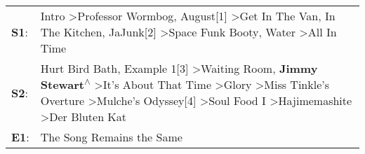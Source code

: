 \begin{supertabular}{p{0.03\textwidth}p{0.92\textwidth}}
 \textbf{S1}:  &                                                                                                                                                                                    Intro\textsuperscript{} \textgreater \enspace Professor Wormbog\textsuperscript{}, \enspace August[1]\textsuperscript{} \textgreater \enspace Get In The Van\textsuperscript{}, \enspace In The Kitchen\textsuperscript{}, \enspace JaJunk[2]\textsuperscript{} \textgreater \enspace Space Funk Booty\textsuperscript{}, \enspace Water\textsuperscript{} \textgreater \enspace All In Time\textsuperscript{}  \enspace  \\
 \textbf{S2}:  &  Hurt Bird Bath\textsuperscript{}, \enspace Example 1[3]\textsuperscript{} \textgreater \enspace Waiting Room\textsuperscript{}, \enspace \textbf{Jimmy Stewart\textsuperscript{$\wedge$}} \textgreater \enspace It's About That Time\textsuperscript{} \textgreater \enspace Glory\textsuperscript{} \textgreater \enspace Miss Tinkle's Overture\textsuperscript{} \textgreater \enspace Mulche's Odyssey[4]\textsuperscript{} \textgreater \enspace Soul Food I\textsuperscript{} \textgreater \enspace Hajimemashite\textsuperscript{} \textgreater \enspace Der Bluten Kat\textsuperscript{}  \enspace  \\
 \textbf{E1}:  &                                                                                                                                                                                                                                                                                                                                                                                                                                                                                                                                                       The Song Remains the Same\textsuperscript{}  \enspace  \\
\end{supertabular}
